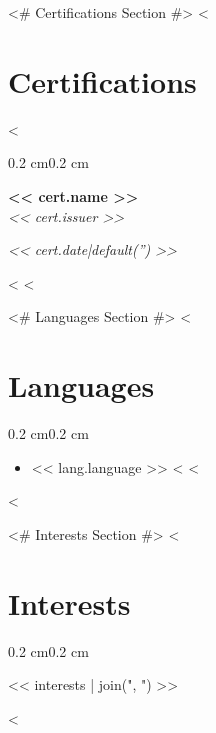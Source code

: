 \documentclass[10pt, letterpaper]{article}
\newenvironment{highlights}{%
    \begin{itemize}[
        topsep=0.10 cm,%
        parsep=0.10 cm,%
        partopsep=0pt,%
        itemsep=0pt,%
        leftmargin=0.4 cm + 10pt%
    ]
}{%
    \end{itemize}%
}
\newenvironment{onecolentry}{%
    \begin{adjustwidth}{0.2 cm}{0.2 cm}%
}{%
    \end{adjustwidth}%
}
\newenvironment{twocolentry}[1]{%
    \begin{onecolentry}%
    \def\twocolentryarg{#1}%
    \noindent
    \begin{minipage}[t]{0.68\textwidth} %
}{%
    \end{minipage}\hfill%
    \begin{minipage}[t]{0.30\textwidth} %
      \raggedleft\twocolentryarg
    \end{minipage}%
    \vspace{0.2cm}%
    \end{onecolentry}%
}
\begin{document}
<# Certifications Section #>
<%
\section{Certifications}
<%
\begin{twocolentry}{\textit{<< cert.date|default('') >>}}
    \textbf{<< cert.name >> }\\
    \textit{<< cert.issuer >> }
\end{twocolentry}
\vspace{0.10 cm}
<%
<%

<# Languages Section #>
<%
\section{Languages}
\begin{onecolentry}
    \begin{highlights}
    <%
        \item << lang.language >> <%
    <%
    \end{highlights}
\end{onecolentry}
<%

<# Interests Section #>
<%
\section{Interests}
\begin{onecolentry}
    << interests | join(", ") >>
\end{onecolentry}
<%
\end{document}
